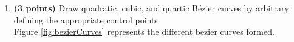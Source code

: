 \documentclass[a4paper, 11pt]{article}
\begin{document}
\begin{enumerate}
\begin{enumerate}[label=\alph*.]
    \item \textbf{(3 points)} Draw quadratic, cubic, and quartic B\'{e}zier curves by arbitrary defining the appropriate control points \\
    Figure \ref{fig:bezierCurves} represents the different bezier curves formed.
        \begin{figure}[ht] 
 \quad 
   \\
  \quad 
\end{figure}
\end{enumerate}
\end{enumerate}
\end{document}

